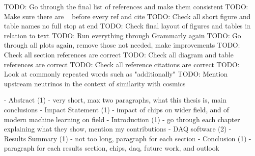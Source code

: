 TODO: Go through the final list of references and make them consistent
TODO: Make sure there are ~ before every ref and cite
TODO: Check all short figure and table names no full stop at end
TODO: Check final layout of figures and tables in relation to text
TODO: Run everything through Grammarly again
TODO: Go through all plots again, remove those not needed, make improvements
TODO: Check all section references are correct
TODO: Check all diagram and table references are correct
TODO: Check all reference citations are correct
TODO: Look at commonly repeated words such as "additionally"
TODO: Mention upstream neutrinos in the context of similarity with cosmics

- Abstract (1) - very short, max two paragraphs, what this thesis is, main conclusions
- Impact Statement (1) - impact of chips on wider field, and of modern machine learning on field
- Introduction (1) - go through each chapter explaining what they show, mention my contributions
- DAQ software (2) 
- Results Summary (1) - not too long, paragraph for each section
- Conclusion (1) - paragraph for each results section, chips, daq, future work, and outlook